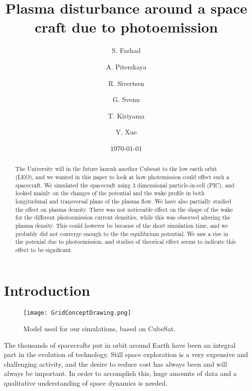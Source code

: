 \documentclass[aip, 
rsi, 
amsmath,
amssymb,
longbibliography,
preprint]{revtex4-1}
\begin{document}
\title[4th 4DSpace Workshop -- Team Godzilla -- Final Report]{Plasma disturbance around a space craft due to photoemission}

\author{S. Farhad} 
\author{A. Piterskaya}
\author{R. Sivertsen}
\author{G. Svenn}

\author{T. Kiriyama}
\author{Y. Xue}

\date{\today}

\begin{abstract}
The University will in the future laucnh another Cubesat to the low earth orbit (LEO), and we wanted in this paper to look at how photemission could effect such a spacecraft. We simulated the spacecraft using 3 dimensional particle-in-cell (PIC), and looked mainly on the changes of the potential and the wake profile in both longitudunal and transversal plane of the plasma flow. We have also partially studied the effect on plasma density. There was not noticeable effect on the shape of the wake for the different photoemission current densities, while this was observed altering the plasma density. This could however be because of the short simulation time, and we probably did not converge enough to the the equilibrium potential. We saw a rise in the potenial due to photoemission, and studies of theorical effect seems to indicate this effect to be significant. 
\end{abstract}

\maketitle

\section{\label{sec:intro} Introduction}

\begin{figure*}[!ht]
\texttt{[image: GridConceptDrawing.png]}
\caption{Model used for our simulations, based on CubeSat.\label{fig:model}}
\end{figure*}

The thousands of spacecrafts put in orbit around Earth have been an integral part in the evolution of technology. Still space exploration is a very expensive and challenging activity, and the desire to reduce cost has always been and will always be important. In order to accomplish this, huge amounts of data and a qualitative understanding of space dynamics is needed. \\
\end{document}
